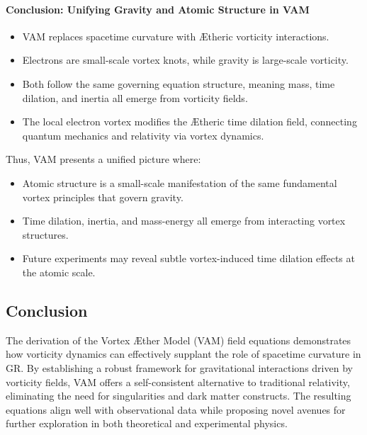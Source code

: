 \paragraph{Conclusion: Unifying Gravity and Atomic Structure in VAM}
\begin{itemize}
    \item VAM replaces spacetime curvature with Ætheric vorticity interactions.
    \item Electrons are small-scale vortex knots, while gravity is large-scale vorticity.
    \item Both follow the same governing equation structure, meaning mass, time dilation, and inertia all emerge from vorticity fields.
    \item The local electron vortex modifies the Ætheric time dilation field, connecting quantum mechanics and relativity via vortex dynamics.
\end{itemize}
Thus, VAM presents a unified picture where:
\begin{itemize}
    \item Atomic structure is a small-scale manifestation of the same fundamental vortex principles that govern gravity.
    \item Time dilation, inertia, and mass-energy all emerge from interacting vortex structures.
    \item Future experiments may reveal subtle vortex-induced time dilation effects at the atomic scale.
\end{itemize}

\subsection{Conclusion}
The derivation of the Vortex Æther Model (VAM) field equations demonstrates how vorticity dynamics can effectively supplant the role of spacetime curvature in GR. By establishing a robust framework for gravitational interactions driven by vorticity fields, VAM offers a self-consistent alternative to traditional relativity, eliminating the need for singularities and dark matter constructs. The resulting equations align well with observational data while proposing novel avenues for further exploration in both theoretical and experimental physics.
